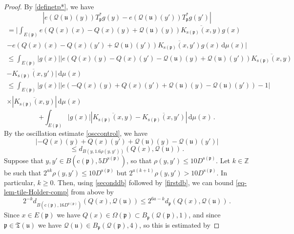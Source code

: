 \documentclass[10pt,a4paper]{article}
\theoremstyle{plain}
\theoremstyle{definition}
\numberwithin{equation}{subsection}
\newcommand{\fp}{{\mathfrak p}}
\newcommand{\fu}{{\mathfrak u}}
\newcommand{\fT}{{\mathfrak T}}
\newcommand{\pc}{{\mathrm{c}}}
\newcommand{\ps}{{\mathrm{s}}}
\newcommand{\tQ}{{Q}}
\newcommand{\fcc}{{\mathcal{Q}}}
\newcommand{\leanok}{}
\begin{document}
    \begin{proof}
        \leanok
        By \eqref{definetp*}, we have
        $$
            |e(\fcc(\fu)(y)) T_{\fp}^* g(y) - e(\fcc(\fu)(y')) T_{\fp}^* g(y')|
        $$
        \begin{multline*}
            =\bigg| \int_{E(\fp)} e(\tQ(x)(x) - \tQ(x)(y) + \fcc(\fu)(y)) \overline{K_{\ps(\fp)}(x, y)} g(x) \\
            - e(\tQ(x)(x) - \tQ(x)(y') + \fcc(\fu)(y')) \overline{K_{\ps(\fp)}(x, y')} g(x) \, \mathrm{d}\mu(x)\bigg|
        \end{multline*}
        \begin{multline*}
            \leq\int_{E(\fp)} |g(x)| |e(\tQ(x)(y) - \tQ(x)(y') - \fcc(\fu)(y) + \fcc(\fu)(y'))\overline{K_{\ps(\fp)}(x, y)}\\
            - \overline{K_{\ps(\fp)}(x, y')}| \, \mathrm{d}\mu(x)
        \end{multline*}
        \begin{multline}
            \leq\int_{E(\fp)} |g(x)| |e(-\tQ(x)(y) + \tQ(x)(y') + \fcc(\fu)(y) - \fcc(\fu)(y')) - 1| \\
            \times |\overline{K_{\ps(\fp)}(x, y)}|\, \mathrm{d}\mu(x) \label{T*Holder1b}
        \end{multline}
      \begin{equation}
            + \int_{E(\fp)} |g(x)| |\overline{K_{\ps(\fp)}(x, y)} - \overline{K_{\ps(\fp)}(x, y')} |\, \mathrm{d}\mu(x)\,.\label{T*Holder1}
        \end{equation}
        By the oscillation estimate \eqref{osccontrol}, we have
        $$
            |-\tQ(x)(y) + \tQ(x)(y') + \fcc(\fu)(y) - \fcc(\fu)(y')|
        $$
      \begin{equation}
            \label{eq-lem-tile-Holder-comp}
            \le d_{B(y, 1.6\rho(y,y'))}(\tQ(x), \fcc(\fu))\,.
        \end{equation}
        Suppose that $y, y' \in B(\pc(\fp), 5D^{\ps(\fp)})$, so that $\rho(y,y') \le 10D^{\ps(\fp)}$.
        Let $k \in \mathbb{Z}$ be such that $2^{ak}\rho(y,y') \le 10D^{\ps(\fp)}$ but $2^{a(k+1)} \rho(y,y') > 10D^{\ps(\fp)}$.
        In particular, $k \ge 0$. Then, using \eqref{seconddb} followed by \eqref{firstdb}, we can bound \eqref{eq-lem-tile-Holder-comp} from above by
        $$
            2^{-k} d_{B(\pc(\fp), 16 D^{\ps(\fp)})}(\tQ(x), \fcc(\fu)) \le 2^{6a - k} d_{\fp}(\tQ(x), \fcc(\fu))\,.
        $$
        Since $x \in E(\fp)$ we have $\tQ(x) \in \Omega(\fp) \subset B_{\fp}(\fcc(\fp), 1)$, and since $\fp \in \fT(\fu)$ we have $\fcc(\fu) \in B_{\fp}(\fcc(\fp), 4)$, so this is estimated by

\end{proof}
\end{document}
